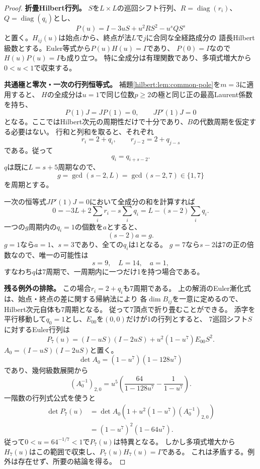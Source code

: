 \documentclass[11pt,a4paper]{ltjsarticle}
\theoremstyle{definition}
\begin{document}
\begin{proof}
\par\smallskip\noindent\textbf{折畳Hilbert行列。}\quad
$S$を$L\times L$の巡回シフト行列、$R=\operatorname{diag}(r_i)$、
$Q=\operatorname{diag}(q_i)$とし、
\[
P(u)=I-3uS+u^2RS^2-u^sQS^s
\]
と置く。$H_{ij}(u)$は始点$i$から、終点が法$L$で$j$に合同な全経路成分の
語長Hilbert級数とする。Euler等式から$P(u)H(u)=I$であり、
$P(0)=I$なので$H(u)P(u)=I$も成り立つ。
特に全成分は有理関数であり、多項式増大から$0<u<1$で収束する。

\par\smallskip\noindent\textbf{共通極と零次・一次の行列恒等式。}\quad
補題\ref{hilbert:lem:common-pole}を$m=3$に適用すると、
$H$の全成分は$u=1$で同じ位数$p\ge2$の極と同じ正の最高Laurent係数を持ち、
\[
P(1)J=JP(1)=0,\qquad JP'(1)J=0
\]
となる。ここではHilbert次元の周期性だけで十分であり、$B$の代数周期を仮定する必要はない。
行和と列和を取ると、それぞれ
\[
r_i=2+q_i,\qquad r_{j-2}=2+q_{j-s}
\]
である。従って
\[
q_i=q_{i+s-2}.
\]
$q$は既に$L=s+5$周期なので、
\[
g=\gcd(s-2,L)=\gcd(s-2,7)\in\{1,7\}
\]
を周期とする。

一次の恒等式$JP'(1)J=0$において全成分の和を計算すれば
\[
0=-3L+2\sum_i r_i-s\sum_iq_i
=L-(s-2)\sum_iq_i.
\]
一つの$g$周期内の$q_i=1$の個数を$a$とすると、
\[
(s-2)a=g.
\]
$g=1$なら$a=1$、$s=3$であり、全ての$q_i$は1となる。
$g=7$なら$s-2$は7の正の倍数なので、唯一の可能性は
\[
s=9,\quad L=14,\quad a=1,
\]
すなわち$q$は7周期で、一周期内に一つだけ1を持つ場合である。

\par\smallskip\noindent\textbf{残る例外の排除。}\quad
この場合$r_i=2+q_i$も7周期である。
上の解消のEuler漸化式は、始点・終点の差に関する帰納法により
各$\dim B_{ij}$を一意に定めるので、Hilbert次元自体も7周期となる。
従って7頂点で折り畳むことができる。
添字を平行移動して$q_0=1$とし、$E_{00}$を$(0,0)$だけが1の行列とすると、
7巡回シフト$S$に対するEuler行列は
\[
P_7(u)=(I-uS)(I-2uS)+u^2(1-u^7)E_{00}S^2.
\]
$A_0=(I-uS)(I-2uS)$と置く。
\[
\det A_0=(1-u^7)(1-128u^7)
\]
であり、幾何級数展開から
\[
(A_0^{-1})_{2,0}
=u^5\left(\frac{64}{1-128u^7}-\frac{1}{1-u^7}\right).
\]
一階数の行列式公式を使うと
\begin{align*}
\det P_7(u)
&=\det A_0\left(1+u^2(1-u^7)(A_0^{-1})_{2,0}\right)\\
&=(1-u^7)^2(1-64u^7).
\end{align*}
従って$0<u=64^{-1/7}<1$で$P_7(u)$は特異となる。
しかし多項式増大から$H_7(u)$はこの範囲で収束し、$P_7(u)H_7(u)=I$である。
これは矛盾する。例外は存在せず、所要の結論を得る。
\end{proof}
\end{document}

